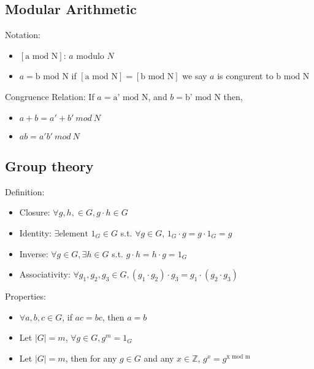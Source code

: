 \subsection*{Modular Arithmetic}
Notation:
\begin{itemize}
    \item $[\text{a mod N}]$: $a$ modulo $N$
    \item $a=\text{b mod N}$ if $[\text{a mod N}]=[\text{b mod N}]$ 
    we say $a$ is congurent to $\text{b mod N}$
\end{itemize}
Congruence Relation: If $a=\text{a' mod N}$, and $b=\text{b' mod N}$ then,
\begin{itemize}
    \item $a+b=a'+b'\ mod\ N$
    \item $ab=a'b'\ mod\ N$
\end{itemize}

\subsection*{Group theory}
Definition:
\begin{itemize}
    \item Closure: $\forall g,h, \in G, g\cdot h \in G$
    \item Identity: $\exists \text{element } 1_G \in G$ s.t. $\forall g\in G$,
    $1_G\cdot g=g\cdot 1_G=g$
    \item Inverse: $\forall g\in G,\exists h\in G$ s.t. $g\cdot h=h\cdot g=1_G$
    \item Associativity: $\forall g_1,g_2,g_3\in G,(g_1\cdot g_2)\cdot g_3=g_1\cdot(g_2\cdot g_3)$
\end{itemize}

Properties:
\begin{itemize}
    \item $\forall a,b,c \in G$, if $ac=bc$, then $a=b$
    \item Let $|G|=m$, $\forall g\in G,g^m=1_G$
    \item Let $|G|=m$, then for any $g\in G$ and any $x\in \mathbb{Z}$, 
    $g^x=g^{\text{x mod m}}$
\end{itemize}